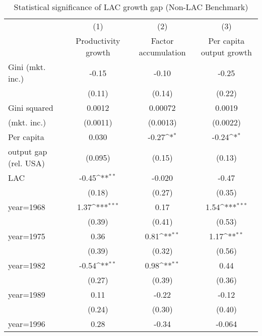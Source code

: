\begin{sidewaystable}[htbp]\centering
\def\sym#1{\ifmmode^{#1}\else\(^{#1}\)\fi}
\caption{Statistical significance of LAC growth gap (Non-LAC Benchmark)}
\begin{tabular}{l*{3}{c}}
\toprule
                &\multicolumn{1}{c}{(1)}&\multicolumn{1}{c}{(2)}&\multicolumn{1}{c}{(3)}\\
                &\multicolumn{1}{c}{Productivity growth}&\multicolumn{1}{c}{Factor accumulation}&\multicolumn{1}{c}{Per capita output growth}\\
\midrule
Gini (mkt. inc.)&    -0.15         &    -0.10         &    -0.25         \\
                &   (0.11)         &   (0.14)         &   (0.22)         \\
\addlinespace
Gini squared    &   0.0012         &  0.00072         &   0.0019         \\
(mkt. inc.)     & (0.0011)         & (0.0013)         & (0.0022)         \\
\addlinespace
Per capita      &    0.030         &    -0.27\sym{*}  &    -0.24\sym{*}  \\
output gap (rel. USA)&  (0.095)         &   (0.15)         &   (0.13)         \\
\addlinespace
LAC             &    -0.45\sym{**} &   -0.020         &    -0.47         \\
                &   (0.18)         &   (0.27)         &   (0.35)         \\
\addlinespace
year=1968       &     1.37\sym{***}&     0.17         &     1.54\sym{***}\\
                &   (0.39)         &   (0.41)         &   (0.53)         \\
\addlinespace
year=1975       &     0.36         &     0.81\sym{**} &     1.17\sym{**} \\
                &   (0.39)         &   (0.32)         &   (0.56)         \\
\addlinespace
year=1982       &    -0.54\sym{**} &     0.98\sym{**} &     0.44         \\
                &   (0.27)         &   (0.39)         &   (0.36)         \\
\addlinespace
year=1989       &     0.11         &    -0.22         &    -0.12         \\
                &   (0.24)         &   (0.30)         &   (0.40)         \\
\addlinespace
year=1996       &     0.28         &    -0.34         &   -0.064         \\

\end{tabular}
\end{sidewaystable}
